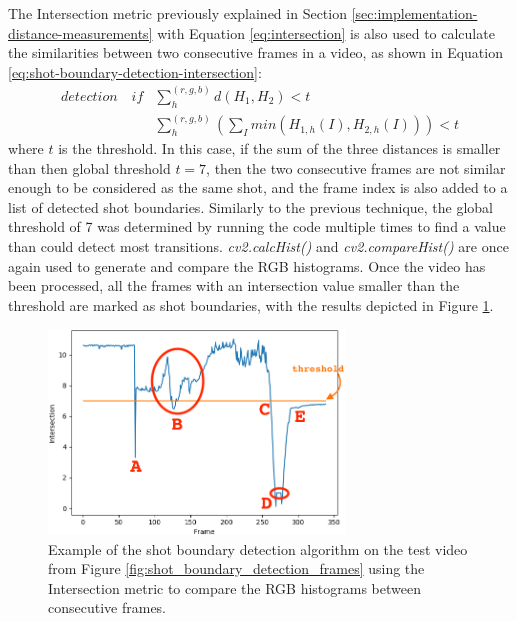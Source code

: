 The Intersection metric previously explained in Section \ref{sec:implementation-distance-measurements} with Equation \ref{eq:intersection} is also used to calculate the similarities between two consecutive frames in a video, as shown in Equation \ref{eq:shot-boundary-detection-intersection}:
\begin{equation}
\label{eq:shot-boundary-detection-intersection}
\begin{aligned}
    detection \quad if & \sum_{h}^{(r,g,b)}d(H_1,H_2) < t \\
    & \sum_{h}^{(r,g,b)} (\sum_Imin(H_{1,h}(I),H_{2,h}(I))) < t
\end{aligned}
\end{equation}
where $t$ is the threshold. In this case, if the sum of the three distances is smaller than then global threshold $t=7$, then the two consecutive frames are not similar enough to be considered as the same shot, and the frame index is also added to a list of detected shot boundaries. Similarly to the previous technique, the global threshold of 7 was determined by running the code multiple times to find a value than could detect most transitions. \textit{cv2.calcHist()} and \textit{cv2.compareHist()} are once again used to generate and compare the RGB histograms. Once the video has been processed, all the frames with an intersection value smaller than the threshold are marked as shot boundaries, with the results depicted in Figure \ref{fig:shot_boundary_detection_intersection}.\\

\begin{figure}[h] 
\centerline{\includegraphics[width=0.70\textwidth]{figures/implementation/shot_boundary_detection_intersection.png}}
\caption{\label{fig:shot_boundary_detection_intersection}Example of the shot boundary detection algorithm on the test video from Figure \ref{fig:shot_boundary_detection_frames} using the Intersection metric to compare the RGB histograms between consecutive frames.}
\end{figure}


